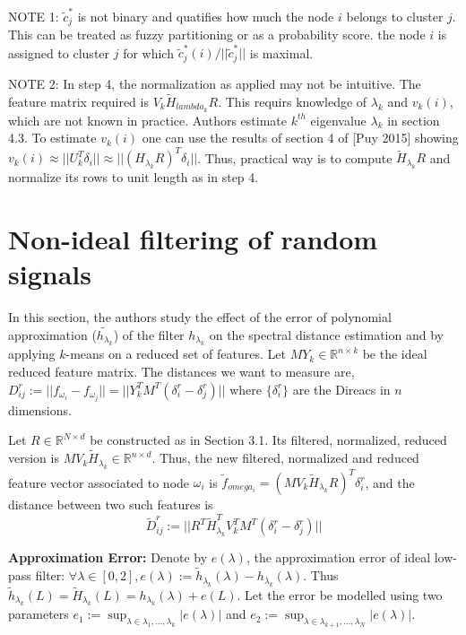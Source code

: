 \documentclass[10pt,a4paper,twoside]{report}
\theoremstyle{definition}
\newcommand{\abs}[1]{\lvert {#1} \rvert}
\newcommand{\norm}[1]{\lvert\lvert {#1} \rvert\rvert}
\begin{document}
	NOTE 1: $\tilde{c}_j^*$ is not binary and quatifies how much the node $i$ belongs to cluster $j$. This can be treated as fuzzy partitioning or as a probability score. the node $i$ is assigned to cluster $j$ for which $\tilde{c}_j^*(i)/\norm{\tilde{c}_j^*}$ is maximal.

	NOTE 2: In step 4, the normalization as applied may not be intuitive. The feature matrix required is $V_k\tilde{H}_{lambda_k}R$. This requirs knowledge of $\lambda_k$ and $v_k(i)$, which are not known in practice. Authors estimate $k^{th}$ eigenvalue $\lambda_k$ in section 4.3. To estimate $v_k(i)$ one can use the results of section 4 of [Puy 2015] showing $v_k(i) \approx \norm{U_k^T\delta_i} \approx \norm{(H_{\lambda_k}R)^T\delta_i}$. Thus, practical way is to compute $\tilde{H}_{\lambda_k}R$ and normalize its rows to unit length as in step 4.

	\section{Non-ideal filtering of random signals}
	In this section, the authors study the effect of the error of polynomial approximation ($\tilde{h_{\lambda_k}}$) of the filter $h_{\lambda_k}$ on the spectral distance estimation and by applying $k$-means on a reduced set of features. Let $MY_k \in \mathbb{R}^{n\times k}$ be the ideal reduced feature matrix. The distances we want to measure are, $D_{ij}^r := \norm{f_{\omega_i} - f_{\omega_j}} = \norm{Y_k^T M^T (\delta_i^r-\delta_j^r)}$ where $\{\delta_i^r\}$ are the Direacs in $n$ dimensions. 

	Let $R \in \mathbb{R}^{N\times d}$ be constructed as in Section 3.1. Its filtered, normalized, reduced version is $MV_k \tilde{H}_{\lambda_k} \in \mathbb{R}^{n\times d}$. 
	Thus, the new filtered, normalized and reduced feature vector associated to node $\omega_i$ is $\tilde{f}_{omega_i} = (MV_k\tilde{H}_{\lambda_k}R)^T\delta_i^r$, and the distance between two such features is $$ \tilde{D}_{ij}^r := \norm{R^T\tilde{H}_{\lambda_k}^TV_k^TM^T(\delta_i^r-\delta_j^r)} $$
	
	\textbf{Approximation Error:} Denote by $e(\lambda)$, the approximation error of ideal low-pass filter: $\forall\lambda \in [0,2], e(\lambda) := \tilde{h}_{\lambda_k}(\lambda) - h_{\lambda_k}(\lambda)$. Thus $\tilde{h}_{\lambda_k}(L) = \tilde{H}_{\lambda_k}(L) = h_{\lambda_k}(\lambda) + e(L)$. Let the error be modelled using two parameters $e_1 := \sup_{\lambda \in {\lambda_1,\dots,\lambda_k}}\abs{e(\lambda)}$ and $e_2 := \sup_{\lambda \in {\lambda_{k+1},\dots,\lambda_N}}\abs{e(\lambda)}$.
	
\end{document}

